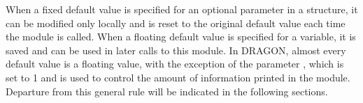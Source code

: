 When a fixed default value is specified for an optional parameter in a
structure, it can be modified only locally and is reset to the original default
value each time the module is called. When a floating default value is specified
for a variable, it is saved and can be used in later calls to this module. In
DRAGON, almost every default value is a floating value, with the exception of
the parameter , which is set to 1 and is used to control the amount
of information printed in the module.  Departure from this general rule will be
indicated in the following sections.
